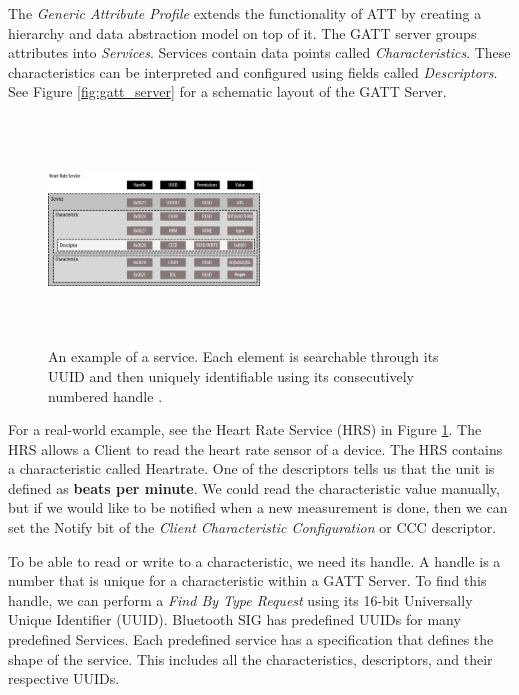 The \textit{Generic Attribute Profile} extends the functionality of ATT by creating a hierarchy and data abstraction model on top of it. The GATT server groups attributes into \textit{Services}. Services contain data points called \textit{Characteristics}. These characteristics can be interpreted and configured using fields called \textit{Descriptors}. See Figure \ref{fig:gatt_server} for a schematic layout of the GATT Server. 

\begin{figure}[]
    \centering
    \includegraphics[width=0.5\textwidth,height=6cm,keepaspectratio=true]{images/heartrate_service}
    \caption{
        An example of a service. Each element is searchable through its UUID and then uniquely identifiable using its consecutively numbered handle \cite{townsend_cufi}.
    }
    \label{fig:hrs_layout}
\end{figure}
For a real-world example, see the Heart Rate Service (HRS) in Figure \ref{fig:hrs_layout}. The HRS allows a Client to read the heart rate sensor of a device. The HRS contains a characteristic called Heartrate. One of the descriptors tells us that the unit is defined as \textbf{beats per minute}. We could read the characteristic value manually, but if we would like to be notified when a new measurement is done, then we can set the Notify bit of the \textit{Client Characteristic Configuration} or CCC descriptor.

To be able to read or write to a characteristic, we need its handle. A handle is a number that is unique for a characteristic within a GATT Server. To find this handle, we can perform a \textit{Find By Type Request} using its 16-bit Universally Unique Identifier (UUID). Bluetooth SIG has predefined UUIDs for many predefined Services. Each predefined service has a specification that defines the shape of the service. This includes all the characteristics, descriptors, and their respective UUIDs.

